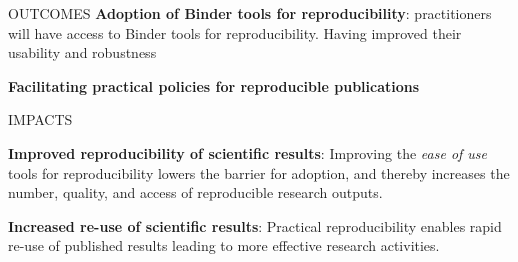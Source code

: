 \begin{multicols}{2}
\begin{summarybox}{OUTCOMES}
\textbf{Adoption of Binder tools for reproducibility}:
practitioners will have access to Binder tools for reproducibility.
Having improved their usability and robustness

\textbf{Facilitating practical policies for reproducible publications}
\end{summarybox}
\begin{summarybox}{IMPACTS}

\textbf{Improved reproducibility of scientific results}: Improving the \emph{ease of use} tools for reproducibility
lowers the barrier for adoption, and thereby increases the number, quality, and
access of reproducible research outputs.

\textbf{Increased re-use of scientific results}: Practical reproducibility
enables rapid re-use of published results leading to more effective research activities.
\end{summarybox}
\end{multicols}
\clearpage

%

%




